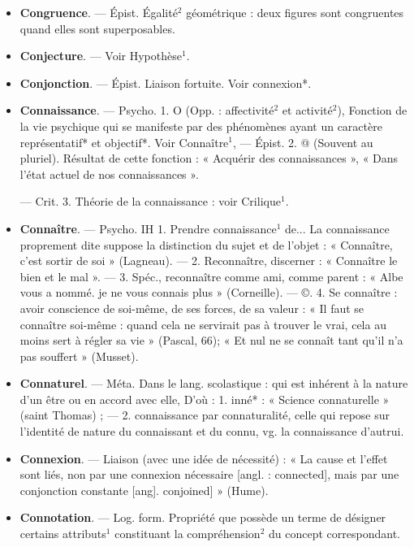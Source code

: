 \begin{itemize}[leftmargin=1cm, label=, itemsep=11pt]
\item {\bf Congruence}. — Épist. Égalité$^2$ géométrique : deux figures sont congruentes quand elles sont superposables.

\item {\bf Conjecture}. — Voir Hypothèse$^1$.

\item {\bf Conjonction}. — Épist. Liaison fortuite. Voir connexion*.

\item {\bf Connaissance}. — Psycho. 1. O (Opp. :
affectivité$^2$ et activité$^2$), Fonction de
la vie psychique qui se manifeste
par des phénomènes ayant un caractère représentatif* et objectif*. Voir
Connaître$^1$, — Épist. 2. @ (Souvent
au pluriel). Résultat de cette fonction : « Acquérir des connaissances »,
« Dans l’état actuel de nos connaissances ».

— Crit. 3. Théorie de la connaissance : voir Crilique$^1$.

\item {\bf Connaître}. — Psycho. IH 1. Prendre
connaissance$^1$ de... La connaissance
proprement dite suppose la distinction du sujet et de l’objet : « Connaître, c’est sortir de soi » (Lagneau).
— 2. Reconnaître, discerner :
« Connaître le bien et le mal ». —
3. Spéc., reconnaître comme ami,
comme parent : « Albe vous a nommé.
je ne vous connais plus » (Corneille).
— ©. 4. Se connaître : avoir conscience de soi-même, de ses forces,
de sa valeur : « Il faut se connaître
soi-même : quand cela ne servirait
pas à trouver le vrai, cela au moins
sert à régler sa vie » (Pascal, 66); « Et
nul ne se connaît tant qu'il n’a pas
souffert » (Musset).

\item {\bf Connaturel}. — Méta. Dans le lang.
scolastique : qui est inhérent à la
nature d’un être ou en accord avec
elle, D'où : 1. inné* : « Science connaturelle » (saint Thomas) ; — 2. connaissance par connaturalité, celle
qui repose sur l’identité de nature
du connaissant et du connu, vg. la
connaissance d'autrui.

\item {\bf Connexion}. — Liaison (avec une idée
de nécessité) : « La cause et l'effet
sont liés, non par une connexion
nécessaire [angl. : connected], mais
par une conjonction constante [ang].
conjoined] » (Hume).

\item {\bf Connotation}. — Log. form. Propriété
que possède un terme de désigner
certains attributs$^1$ constituant la
compréhension$^2$ du concept correspondant.


\end{itemize}
